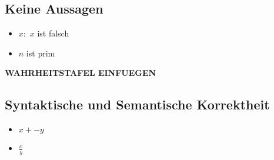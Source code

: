 \documentclass[10pt,a4paper]{article}
\begin{document}
\subsection{Keine Aussagen}
\begin{itemize}
\item \glqq $x:$ $x$ ist falsch\grqq{}
\item \glqq $n$ ist prim\grqq{}
\end{itemize}
%
\textbf{WAHRHEITSTAFEL EINFUEGEN}
\subsection{Syntaktische und Semantische Korrektheit}
\begin{itemize}
\item \( x + - y \)
\item \( \frac{x}{y} \)
\end{itemize}
%
\end{document}
